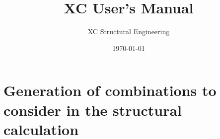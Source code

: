 \documentclass[a4paper,twoside]{book}
\title{XC User's Manual}
\author{XC Structural Engineering}
\date{\today}
\begin{document}
\maketitle
\lstset{language=Python}          %
\setcounter{secnumdepth}{4}
\setcounter{tocdepth}{4}
\tableofcontents
\listoftables











%









\appendix
\chapter{Generation of combinations to consider in the structural calculation}



\begin{thebibliography}{77}	%
\small				%

\end{thebibliography}
\end{document}
